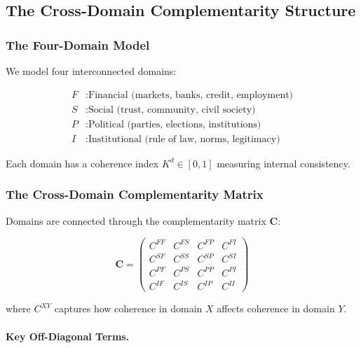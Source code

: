 \subsection{The Cross-Domain Complementarity Structure}

\subsubsection{The Four-Domain Model}

We model four interconnected domains:

\begin{align}
F &: \text{Financial (markets, banks, credit, employment)} \\
S &: \text{Social (trust, community, civil society)} \\
P &: \text{Political (parties, elections, institutions)} \\
I &: \text{Institutional (rule of law, norms, legitimacy)}
\end{align}

Each domain has a coherence index $K^d \in [0,1]$ measuring internal consistency.

\subsubsection{The Cross-Domain Complementarity Matrix}

Domains are connected through the complementarity matrix $\mathbf{C}$:

\begin{equation}
\mathbf{C} = \begin{pmatrix}
C^{FF} & C^{FS} & C^{FP} & C^{FI} \\
C^{SF} & C^{SS} & C^{SP} & C^{SI} \\
C^{PF} & C^{PS} & C^{PP} & C^{PI} \\
C^{IF} & C^{IS} & C^{IP} & C^{II}
\end{pmatrix}
\label{eq:C-matrix}
\end{equation}

where $C^{XY}$ captures how coherence in domain $X$ affects coherence in domain $Y$.

\paragraph{Key Off-Diagonal Terms.}

